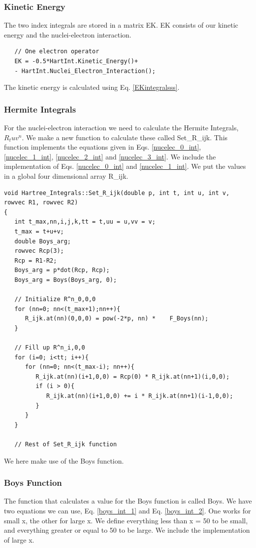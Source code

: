 \documentclass[a4paper,norsk,11pt,twoside]{report}
\begin{document}
\subsubsection{Kinetic Energy}
The two index integrals are stored in a matrix EK. EK consists of our kinetic energy and the nuclei-electron interaction. \\ 

\begin{lstlisting}
   // One electron operator
   EK = -0.5*HartInt.Kinetic_Energy()+
   - HartInt.Nuclei_Electron_Interaction();
\end{lstlisting}

The kinetic energy is calculated using Eq. \eqref{EKintegralsss}. \\

\subsubsection{Hermite Integrals}
For the nuclei-electron interaction we need to calculate the Hermite Integrals, $R_tuv^n$. We make a new function to calculate these called Set\_R\_ijk. This function implements the equations given in Eqs. \eqref{nucelec_0_int}, \eqref{nucelec_1_int}, \eqref{nucelec_2_int} and \eqref{nucelec_3_int}. We include the implementation of Eqs. \eqref{nucelec_0_int} and  \eqref{nucelec_1_int}. We put the values in a global four dimensional array R\_ijk.

\begin{lstlisting}
void Hartree_Integrals::Set_R_ijk(double p, int t, int u, int v, rowvec R1, rowvec R2)
{
   int t_max,nn,i,j,k,tt = t,uu = u,vv = v;
   t_max = t+u+v;
   double Boys_arg;
   rowvec Rcp(3);
   Rcp = R1-R2;
   Boys_arg = p*dot(Rcp, Rcp);
   Boys_arg = Boys(Boys_arg, 0);
   
   // Initialize R^n_0,0,0
   for (nn=0; nn<(t_max+1);nn++){
      R_ijk.at(nn)(0,0,0) = pow(-2*p, nn) *    F_Boys(nn);
   }

   // Fill up R^n_i,0,0
   for (i=0; i<tt; i++){
      for (nn=0; nn<(t_max-i); nn++){
         R_ijk.at(nn)(i+1,0,0) = Rcp(0) * R_ijk.at(nn+1)(i,0,0);
         if (i > 0){
            R_ijk.at(nn)(i+1,0,0) += i * R_ijk.at(nn+1)(i-1,0,0);
         }
      }
   }
   
   // Rest of Set_R_ijk function   
\end{lstlisting}
We here make use of the Boys function.

\subsubsection{Boys Function}
The function that calculates a value for the Boys function is called Boys. We have two equations we can use, Eq. \eqref{boys_int_1} and Eq. \eqref{boys_int_2}. One works for small x, the other for large x. We define everything less than x = 50 to be small, and everything greater or equal to 50 to be large. We include the implementation of large x. \\
\end{document}
